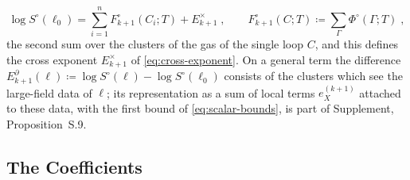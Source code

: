 \documentclass[11pt]{preprint}
\numberwithin{equation}{section}
\theoremstyle{definition}
\theoremstyle{remark}
\theoremstyle{plain}
\begin{document}
\begin{equation}\label{eq:cross-exponent-definition}
    \log S^\circ(\ell_0) = \sum_{i=1}^{n}F^\circ_{k+1}(C_i; T) + E^\times_{k+1}\;,
    \qquad
    F^\circ_{k+1}(C; T) \coloneqq \sum_{\Gamma}\Phi^\circ(\Gamma; T)\;,
\end{equation}
the second sum over the clusters of the gas of the single loop $C$, and this defines the cross exponent $E^\times_{k+1}$ of \eqref{eq:cross-exponent}. On a general term the difference $E^\partial_{k+1}(\ell) \coloneqq \log S^\circ(\ell) - \log S^\circ(\ell_0)$ consists of the clusters which see the large-field data of $\ell$; its representation as a sum of local terms $e^{(k+1)}_X$ attached to these data, with the first bound of \eqref{eq:scalar-bounds}, is part of Supplement, Proposition~S.9.

\subsection{The Coefficients}\label{sec:coefficients}
\end{document}
